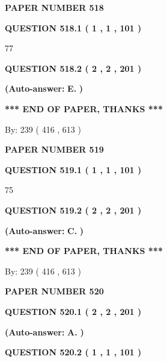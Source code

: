 \documentclass{ctexart}
\begin{document}
   
 {\textbf{ \Large{ PAPER NUMBER  518  }}}
   
   
   
   
  
  
{\textbf{\large{QUESTION
518.1 
 ( 1 , 1 , 101 )
}}}

77
  
  
{\textbf{\large{QUESTION
518.2 
 ( 2 , 2 , 201 )
}}}
 
 
{\textbf{(Auto-answer:}}
{\textbf{\large{
E.}}}
{\textbf{)}}
 
 
   
   
   
   
\vspace{1.0in} 
{\textbf{\large{ *** END OF PAPER, THANKS *** }}} 
   
   
\hspace{1.0in} By: 
 239 ( 416 ,  613 )
   
   
   
   
\newpage 
\setcounter{page}{ 
   519001 } 
   
   
 {\textbf{ \Large{ PAPER NUMBER  519  }}}
   
   
   
   
  
  
{\textbf{\large{QUESTION
519.1 
 ( 1 , 1 , 101 )
}}}

75
  
  
{\textbf{\large{QUESTION
519.2 
 ( 2 , 2 , 201 )
}}}
 
 
{\textbf{(Auto-answer:}}
{\textbf{\large{
C.}}}
{\textbf{)}}
 
 
   
   
   
   
\vspace{1.0in} 
{\textbf{\large{ *** END OF PAPER, THANKS *** }}} 
   
   
\hspace{1.0in} By: 
 239 ( 416 ,  613 )
   
   
   
   
\newpage 
\setcounter{page}{ 
   520001 } 
   
   
 {\textbf{ \Large{ PAPER NUMBER  520  }}}
   
   
   
   
  
  
{\textbf{\large{QUESTION
520.1 
 ( 2 , 2 , 201 )
}}}
 
 
{\textbf{(Auto-answer:}}
{\textbf{\large{
A.}}}
{\textbf{)}}
 
 
  
  
{\textbf{\large{QUESTION
520.2 
 ( 1 , 1 , 101 )
}}}
\end{document}
